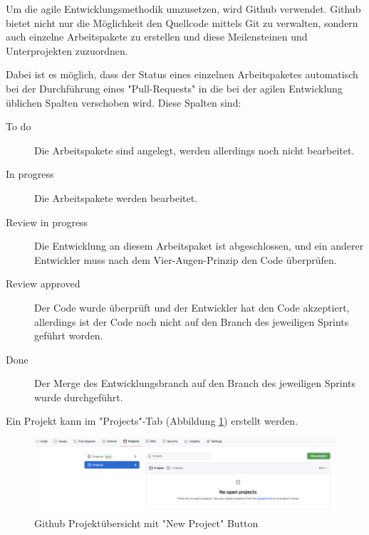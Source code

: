 \label{sec:github}

Um die agile Entwicklungsmethodik umzusetzen, wird Github verwendet. 
Github bietet nicht nur die Möglichkeit den Quellcode mittels Git zu verwalten, sondern auch einzelne Arbeitspakete zu erstellen und diese Meilensteinen und Unterprojekten zuzuordnen.

Dabei ist es möglich, dass der Status eines einzelnen Arbeitspaketes automatisch bei der Durchführung eines "Pull-Requests" in die bei der agilen Entwicklung üblichen Spalten verschoben wird. Diese Spalten sind:

\begin{description}
    \item[To do] Die Arbeitspakete sind angelegt, werden allerdings noch nicht bearbeitet.
    \item[In progress] Die Arbeitspakete werden bearbeitet.
    \item[Review in progress] Die Entwicklung an diesem Arbeitspaket ist abgeschlossen, und ein anderer Entwickler muss nach dem Vier-Augen-Prinzip den Code überprüfen. 
    \item[Review approved] Der Code wurde überprüft und der Entwickler hat den Code akzeptiert, allerdings ist der Code noch nicht auf den Branch des jeweiligen Sprints geführt worden.
    \item[Done] Der Merge des Entwicklungsbranch auf den Branch des jeweiligen Sprints wurde durchgeführt.
\end{description}



Ein Projekt kann im "Projects"-Tab (Abbildung \ref{fig:newProject}) erstellt werden.

\begin{figure}[H]
    \centering
    \includegraphics[width=\textwidth]{media/ProjectManagement/CreateProject.png}
    \caption{Github Projektübersicht mit "New Project" Button}
    \label{fig:newProject}
\end{figure}


